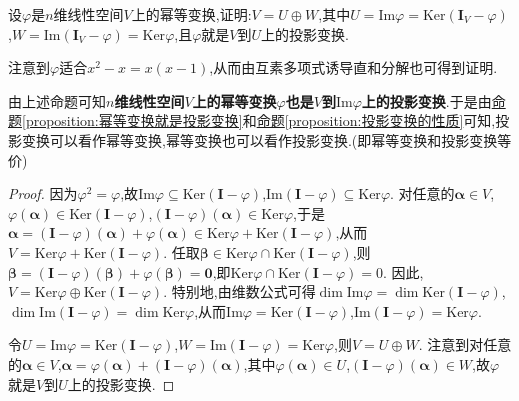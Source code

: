 \documentclass[../../main.tex]{subfiles}%
\begin{document}
\begin{proposition}\label{proposition:幂等变换就是投影变换}
设\(\varphi\)是\(n\)维线性空间\(V\)上的幂等变换,证明:\(V = U\oplus W\),其中\(U = \text{Im}\varphi=\text{Ker}(\boldsymbol{I}_V - \varphi)\),\(W = \text{Im}(\boldsymbol{I}_V - \varphi)=\text{Ker}\varphi\),且\(\varphi\)就是\(V\)到\(U\)上的投影变换.
\end{proposition}
\begin{note}
注意到$\varphi$适合$x^2-x=x(x-1)$,从而由互素多项式诱导直和分解也可得到证明.
\end{note}
\begin{note}
由上述命题可知\textbf{\(n\)维线性空间\(V\)上的幂等变换\(\varphi\)也是\(V\)到\(\text{Im}\varphi\)上的投影变换}.于是由\hyperref[proposition:幂等变换就是投影变换]{命题\ref{proposition:幂等变换就是投影变换}}和\hyperref[proposition:投影变换的性质]{命题\ref{proposition:投影变换的性质}}可知,投影变换可以看作幂等变换,幂等变换也可以看作投影变换.(即\hypertarget{幂等变换和投影变换等价}{幂等变换和投影变换等价})
\end{note}
\begin{proof}

因为\(\varphi^2 = \varphi\),故\(\text{Im}\varphi\subseteq\text{Ker}(\boldsymbol{I} - \varphi)\),\(\text{Im}(\boldsymbol{I} - \varphi)\subseteq\text{Ker}\varphi\). 对任意的\(\boldsymbol{\alpha}\in V\),\(\varphi(\boldsymbol{\alpha})\in\text{Ker}(\boldsymbol{I} - \varphi)\),\((\boldsymbol{I} - \varphi)(\boldsymbol{\alpha})\in\text{Ker}\varphi\),于是\(\boldsymbol{\alpha}=(\boldsymbol{I} - \varphi)(\boldsymbol{\alpha})+\varphi(\boldsymbol{\alpha})\in\text{Ker}\varphi+\text{Ker}(\boldsymbol{I} - \varphi)\),从而\(V = \text{Ker}\varphi+\text{Ker}(\boldsymbol{I} - \varphi)\). 任取\(\boldsymbol{\beta}\in\text{Ker}\varphi\cap\text{Ker}(\boldsymbol{I} - \varphi)\),则\(\boldsymbol{\beta}=(\boldsymbol{I}-\varphi)(\boldsymbol{\beta})+\varphi(\boldsymbol{\beta}) = \boldsymbol{0}\),即\(\text{Ker}\varphi\cap\text{Ker}(\boldsymbol{I}-\varphi)= 0\). 因此,\(V = \text{Ker}\varphi\oplus\text{Ker}(\boldsymbol{I}-\varphi)\). 特别地,由维数公式可得\(\dim\text{Im}\varphi=\dim\text{Ker}(\boldsymbol{I} - \varphi)\),\(\dim\text{Im}(\boldsymbol{I} - \varphi)=\dim\text{Ker}\varphi\),从而\(\text{Im}\varphi=\text{Ker}(\boldsymbol{I} - \varphi)\),\(\text{Im}(\boldsymbol{I} - \varphi)=\text{Ker}\varphi\).

令\(U = \text{Im}\varphi=\text{Ker}(\boldsymbol{I} - \varphi)\),\(W = \text{Im}(\boldsymbol{I} - \varphi)=\text{Ker}\varphi\),则\(V = U\oplus W\). 注意到对任意的\(\boldsymbol{\alpha}\in V\),\(\boldsymbol{\alpha}=\varphi(\boldsymbol{\alpha})+(\boldsymbol{I} - \varphi)(\boldsymbol{\alpha})\),其中\(\varphi(\boldsymbol{\alpha})\in U\),\((\boldsymbol{I} - \varphi)(\boldsymbol{\alpha})\in W\),故\(\varphi\)就是\(V\)到\(U\)上的投影变换.

\end{proof}
\end{document}

